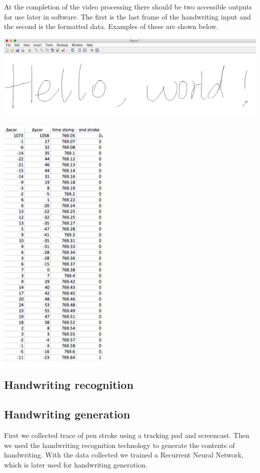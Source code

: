 \documentclass{article} %
\begin{document}
At the completion of the video processing there should be two accessible outputs for use later in software. The first is the last frame of the handwriting input and the second is the formatted data. Examples of these are shown below.
\begin{center}
\includegraphics[scale = 0.2]{Hello_world.png}
\end{center}
\begin{center}
\includegraphics[scale = 0.7]{Collected_Data.png}
\end{center}


\subsection{Handwriting recognition}
\subsection{Handwriting generation}
First we collected trace of pen stroke using a tracking pad and screencast. Then we used the handwriting recognition technology to generate the contents of handwriting. With the data collected we trained a Recurrent Neural Network, which is later used for handwriting generation. 
\end{document}
